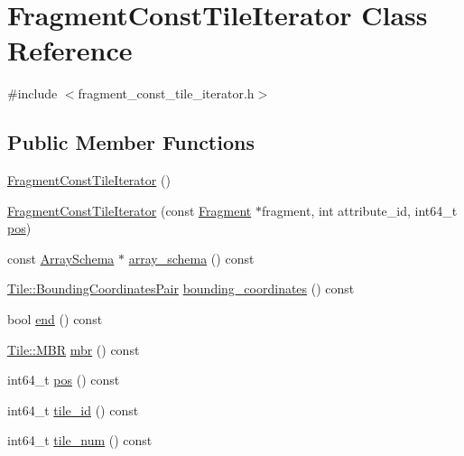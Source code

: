\hypertarget{classFragmentConstTileIterator}{}\section{Fragment\+Const\+Tile\+Iterator Class Reference}
\label{classFragmentConstTileIterator}


{\ttfamily \#include $<$fragment\+\_\+const\+\_\+tile\+\_\+iterator.\+h$>$}

\subsection*{Public Member Functions}
\begin{DoxyCompactItemize}
\item 
\hyperlink{classFragmentConstTileIterator_a5a28ecca82d1180fc9bec18ffa9ee8a6}{Fragment\+Const\+Tile\+Iterator} ()
\item 
\hyperlink{classFragmentConstTileIterator_ad6651bf4f8f644cd78175615fcd1d9db}{Fragment\+Const\+Tile\+Iterator} (const \hyperlink{classFragment}{Fragment} $\ast$fragment, int attribute\+\_\+id, int64\+\_\+t \hyperlink{classFragmentConstTileIterator_af7a63c93c1e82baff91c099f63617971}{pos})
\item 
const \hyperlink{classArraySchema}{Array\+Schema} $\ast$ \hyperlink{classFragmentConstTileIterator_a05941908fd6f8efdece084ec2ab8d0a1}{array\+\_\+schema} () const 
\item 
\hyperlink{classTile_a7103069b7ba05d1032733e3a026b8632}{Tile\+::\+Bounding\+Coordinates\+Pair} \hyperlink{classFragmentConstTileIterator_acb177206f3c63daf4ea6cce53bdc1993}{bounding\+\_\+coordinates} () const 
\item 
bool \hyperlink{classFragmentConstTileIterator_a04453128ebc3f0bd7225bb38195cd88a}{end} () const 
\item 
\hyperlink{classTile_a0b0f911c937d339ce110c18a2d015a4d}{Tile\+::\+M\+B\+R} \hyperlink{classFragmentConstTileIterator_a1c536f2e2b86969c4f8db0ad1abf54a7}{mbr} () const 
\item 
int64\+\_\+t \hyperlink{classFragmentConstTileIterator_af7a63c93c1e82baff91c099f63617971}{pos} () const 
\item 
int64\+\_\+t \hyperlink{classFragmentConstTileIterator_aa067e306c0b4053c59cc4cd53b7921fe}{tile\+\_\+id} () const 
\item 
int64\+\_\+t \hyperlink{classFragmentConstTileIterator_a624d4d79c9c989c9b4db9fcebd0813f4}{tile\+\_\+num} () const 
\item 

\end{DoxyCompactItemize}
